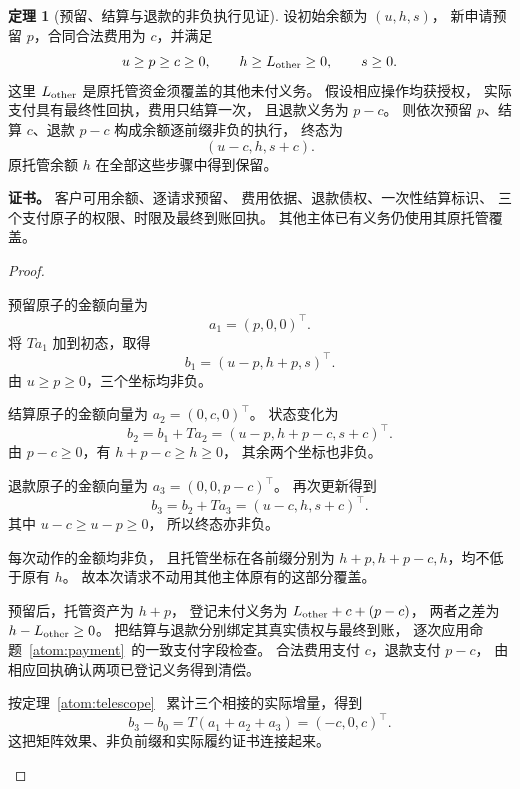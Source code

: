 \documentclass[UTF8,12pt,a4paper,openany,fontset=none,zihao=false]{ctexrep}
\theoremstyle{definition}
\newtheorem{theorem}{定理}[chapter]
\newenvironment{certificate}{\par\noindent\textbf{证书。}\ignorespaces}{\par}
\newcommand{\1}{\mathbf 1}
\begin{document}
\begin{theorem}[预留、结算与退款的非负执行见证]
\label{std:funded-settlement}
设初始余额为 \((u,h,s)\)，
新申请预留 \(p\)，合同合法费用为 \(c\)，并满足
\[
u\ge p\ge c\ge0,\qquad
h\ge L_{\rm other}\ge0,\qquad s\ge0.
\]
这里 \(L_{\rm other}\) 是原托管资金须覆盖的其他未付义务。
假设相应操作均获授权，
实际支付具有最终性回执，费用只结算一次，
且退款义务为 \(p-c\)。
则依次预留 \(p\)、结算 \(c\)、退款 \(p-c\)
构成余额逐前缀非负的执行，
终态为
\[
(u-c,h,s+c).
\]
原托管余额 \(h\) 在全部这些步骤中得到保留。
\end{theorem}
\begin{certificate}
客户可用余额、逐请求预留、
费用依据、退款债权、一次性结算标识、
三个支付原子的权限、时限及最终到账回执。
其他主体已有义务仍使用其原托管覆盖。
\end{certificate}
\begin{proof}
\begin{semanticsteps}
\item 预留原子的金额向量为
\[
a_1=(p,0,0)^\top.
\]
将 \(Ta_1\) 加到初态，取得
\[
b_1=(u-p,h+p,s)^\top.
\]
由 \(u\ge p\ge0\)，三个坐标均非负。
\item 结算原子的金额向量为
\(a_2=(0,c,0)^\top\)。
状态变化为
\[
b_2=b_1+Ta_2
=(u-p,h+p-c,s+c)^\top.
\]
由 \(p-c\ge0\)，有 \(h+p-c\ge h\ge0\)，
其余两个坐标也非负。
\item 退款原子的金额向量为
\(a_3=(0,0,p-c)^\top\)。
再次更新得到
\[
b_3=b_2+Ta_3
=(u-c,h,s+c)^\top.
\]
其中 \(u-c\ge u-p\ge0\)，
所以终态亦非负。
\item 每次动作的金额均非负，
且托管坐标在各前缀分别为
\(h+p,h+p-c,h\)，均不低于原有 \(h\)。
故本次请求不动用其他主体原有的这部分覆盖。
\item 预留后，托管资产为 \(h+p\)，
登记未付义务为 \(L_{\rm other}+c+(p-c)\)，
两者之差为 \(h-L_{\rm other}\ge0\)。
把结算与退款分别绑定其真实债权与最终到账，
逐次应用命题~\ref{atom:payment}~的一致支付字段检查。
合法费用支付 \(c\)，退款支付 \(p-c\)，
由相应回执确认两项已登记义务得到清偿。
\item 按定理~\ref{atom:telescope}~
累计三个相接的实际增量，得到
\[
b_3-b_0=T(a_1+a_2+a_3)=(-c,0,c)^\top.
\]
这把矩阵效果、非负前缀和实际履约证书连接起来。
\end{semanticsteps}
\end{proof}
\end{document}
